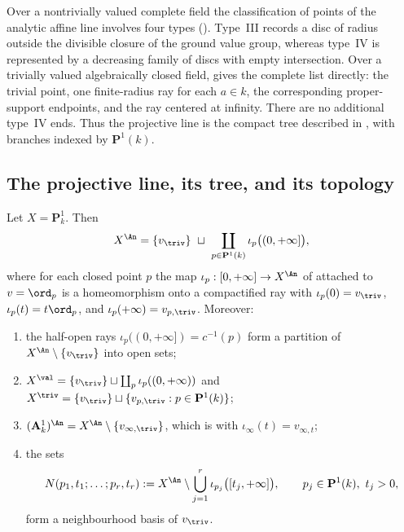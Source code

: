 \begin{remark}
\label{rem:ch32-no-type-four}
Over a nontrivially valued complete field the classification of points of
the analytic affine line involves four types
().  Type~\textup{III} records a disc of
radius outside the divisible closure of the ground value group, whereas
type~\textup{IV} is represented by a decreasing family of discs with empty
intersection.  Over a trivially valued algebraically closed field,
 gives the complete list directly: the
trivial point, one finite-radius ray for each $a\in k$, the corresponding
proper-support endpoints, and the ray centered at infinity.  There are no
additional type~\textup{IV} ends.  Thus the projective line is the compact
tree described in , with branches indexed
by $\mathbf P^1(k)$.
\end{remark}

\subsection{The projective line, its tree, and its topology}
\label{sec:ch32-p1}

\begin{theorem}
\label{thm:ch32-p1-classification}
Let $X=\mathbf P^1_k$.  Then
\[
 X^{\An}=\{v_{\triv}\}\ \sqcup\
 \coprod_{p\in\mathbf P^1(k)}\iota_p\bigl((0,+\infty]\bigr),
\]
where for each closed point $p$ the map
$\iota_p:[0,+\infty]\to X^{\An}$ of 
attached to $v=\ord_p$ is a homeomorphism onto a compactified ray with
$\iota_p(0)=v_{\triv}$, $\iota_p(t)=t\ord_p$, and
$\iota_p(+\infty)=v_{p,\triv}$.  Moreover:
\begin{enumerate}
\item\label{itm:ch32-p1:partition}
the half-open rays $\iota_p((0,+\infty])=c^{-1}(p)$ form a partition of
$X^{\An}\setminus\{v_\triv\}$ into open sets;
\item\label{itm:ch32-p1:strata}
$X^{\val}=\{v_\triv\}\sqcup\coprod_p\iota_p((0,+\infty))$ and
$X^{\triv}=\{v_\triv\}\sqcup\{v_{p,\triv}:p\in\mathbf P^1(k)\}$;
\item\label{itm:ch32-p1:affine}
$(\mathbf A^1_k)^{\An}=X^{\An}\setminus\{v_{\infty,\triv}\}$, which is
\Cref{thm:ch32-a1-classification} with $\iota_\infty(t)=v_{\infty,t}$;
\item\label{itm:ch32-p1:basis}
the sets
\[
 N(p_1,t_1;\ldots;p_r,t_r)
 :=X^{\An}\setminus\bigcup_{j=1}^r\iota_{p_j}\bigl([t_j,+\infty]\bigr),
 \qquad p_j\in\mathbf P^1(k),\ t_j>0,
\]
form a neighbourhood basis of $v_\triv$.
\end{enumerate}
\end{theorem}

